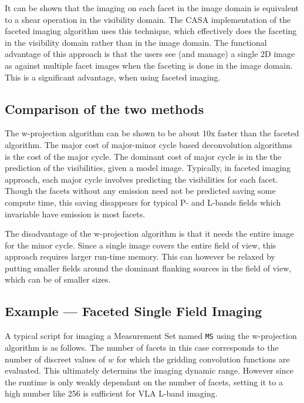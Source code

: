It can be shown that the imaging on each facet in the image domain is
equivalent to a shear operation in the visibility domain.  The CASA
implementation of the faceted imaging algorithm uses this technique,
which effectively does the faceting in the visibility domain rather
than in the image domain.  The functional advantage of this approach is
that the users see (and manage) a single 2D image as against multiple
facet images when the faceting is done in the image domain.  This is a
significant advantage, when using faceted imaging.

\subsection{Comparison of the two methods}
\label{section:imtool.widefield.compare}

The w-projection algorithm can be shown to be about 10x faster than the
faceted algorithm.  The major cost of major-minor cycle based
deconvolution algorithms is the cost of the major cycle.  The dominant
cost of major cycle is in the the prediction of the visibilities, given
a model image.  Typically, in faceted imaging approach, each major
cycle involves predicting the visibilities for each facet.  Though
the facets without any emission need not be predicted saving some
compute time, this saving disappears for typical P- and L-bands fields
which invariable have emission is most facets.

The disadvantage of the w-projection algorithm is that it needs the
entire image for the minor cycle.  Since a single image covers the
entire field of view, this approach requires larger run-time memory.
This can however be relaxed by putting smaller fields around the
dominant flanking sources in the field of view, which can be of
smaller sizes.

\subsection{Example --- Faceted Single Field Imaging}
\label{section:imtool.widefield.exfacet}

A typical script for imaging a Measurement Set named {\tt MS} using the
w-projection algorithm is as follows.  The number of facets in this
case corresponds to the number of discreet values of $w$ for which the
gridding convolution functions are evaluated.  This ultimately
determins the imaging dynamic range.  However since the runtime is
only weakly dependant on the number of facets, setting it to a high
number like 256 is sufficient for VLA L-band imaging.

